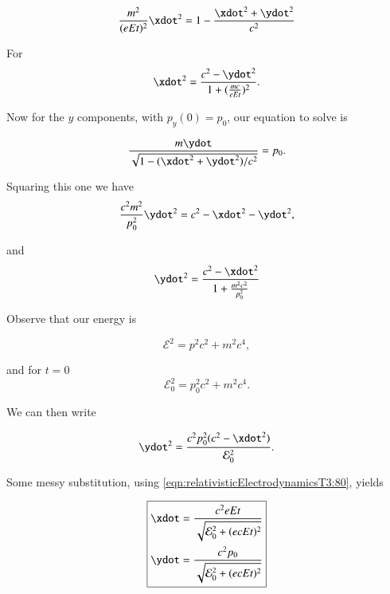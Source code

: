 \begin{equation}\label{eqn:relativisticElectrodynamicsT3:70}
\frac{m^2}{(e E t)^2} \xdot^2 = 1 - \frac{\xdot^2 + \ydot^2}{c^2}
\end{equation}

For
\begin{equation}\label{eqn:relativisticElectrodynamicsT3:80}
\xdot^2 = \frac{c^2 - \ydot^2}{1 + (\frac{mc}{eEt})^2}.
\end{equation}

Now for the $y$ components, with $p_y(0) = p_0$, our equation to solve is

\begin{equation}\label{eqn:relativisticElectrodynamicsT3:82}
\frac{m \ydot}{\sqrt{1 - (\xdot^2 + \ydot^2)/c^2}} = p_0.
\end{equation}

Squaring this one we have
\begin{equation}\label{eqn:relativisticElectrodynamicsT3:84}
\frac{c^2 m^2}{p_0^2} \ydot^2 = c^2 - \xdot^2 - \ydot^2 ,
\end{equation}

and
\begin{equation}\label{eqn:relativisticElectrodynamicsT3:86}
\ydot^2 = \frac{ c^2 - \xdot^2}{1 + \frac{m^2 c^2}{p_0^2}}
\end{equation}

Observe that our energy is

\begin{equation}\label{eqn:relativisticElectrodynamicsT3:100}
\mathcal{E}^2 = p^2 c^2 + m^2 c^4,
\end{equation}

and for $t=0$
\begin{equation}\label{eqn:relativisticElectrodynamicsT3:100b}
\mathcal{E}_0^2 = p_0^2 c^2 + m^2 c^4.
\end{equation}

We can then write

\begin{equation}\label{eqn:relativisticElectrodynamicsT3:120}
\ydot^2 = \frac{ c^2 p_0^2 (c^2 - \xdot^2)}{ \mathcal{E}_0^2 }.
\end{equation}

Some messy substitution, using \ref{eqn:relativisticElectrodynamicsT3:80}, yields

\begin{equation}\label{eqn:relativisticElectrodynamicsT3:140}
\boxed{
\begin{aligned}
\xdot &= \frac{c^2 e E t}{\sqrt{ \mathcal{E}_0^2 + (e c E t)^2 }} \\
\ydot &= \frac{c^2 p_0 }{\sqrt{ \mathcal{E}_0^2 + (e c E t)^2 }}
\end{aligned}
}
\end{equation}



